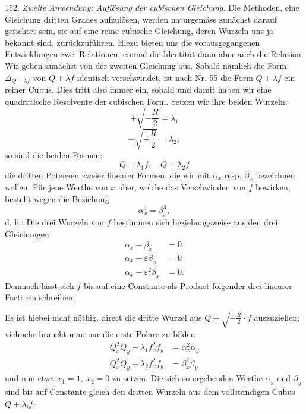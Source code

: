 152. \textit{Zweite Anwendung: Auflösung der cubischen Gleichung.} Die Methoden, eine Gleichung dritten Grades aufzulösen, werden naturgemäss zunächst darauf gerichtet sein, sie auf eine reine cubische Gleichung, deren Wurzeln uns ja bekannt sind, zurückzuführen. Hiezu bieten uns die vorausgegangenen Entwicklungen zwei Relationen, einmal die  Identität
dann aber auch die Relation
Wir gehen zunächst von der zweiten Gleichung aus. Sobald nämlich die  Form $\Delta_{Q+\lambda f}$ von $Q+\lambda f$ identisch verschwindet, ist nach Nr. 55 die Form $Q+\lambda f$ ein reiner Cubus. Dies tritt also immer ein, sobald
und damit haben wir eine quadratische Resolvente der cubischen Form. Setzen wir ihre beiden Wurzeln:
\[
+\sqrt{-\frac{R}{2}} = \lambda_1
\]
\[
-\sqrt{-\frac{R}{2}} = \lambda_2,
\]
so sind die beiden Formen:
\[
Q+\lambda_1 f, \quad Q+\lambda_2 f
\]
die dritten Potenzen zweier linearer Formen, die wir mit $\alpha_x$ resp. $\beta_x$ bezeichnen wollen. Für jene Werthe von $x$ aber, welche das Verschwinden von $f$ bewirken, besteht wegen
die Beziehung
\[
\alpha_x^3 = \beta_x^3,
\]
d. h.: \glqq Die drei Wurzeln von $f$ bestimmen sich beziehungsweise aus den drei Gleichungen
\[
\begin{aligned}
\alpha_x - \beta_x &= 0\\
\alpha_x - \varepsilon\beta_x &= 0\\
\alpha_x - \varepsilon^2\beta_x &= 0.
\end{aligned}
\]\grqq{}
Demnach lässt sich $f$ bis auf eine Constante als Product folgender drei linearer Factoren schreiben:


Es ist hiebei nicht nöthig, direct die dritte Wurzel aus $Q\pm\sqrt{-\frac{R}{2}}\cdot f$ auszuziehen; vielmehr braucht man nur die erste Polare zu bilden
\[
\begin{aligned}
Q_x^2 Q_y + \lambda_1 f_x^2 f_y &= \alpha_x^2\alpha_y\\
Q_x^2 Q_y + \lambda_2 f_x^2 f_y &= \beta_x^2\beta_y
\end{aligned}
\]
und nun etwa $x_1 = 1,\ x_2 = 0$ zu setzen. Die sich so ergebenden Werthe $\alpha_y$ und $\beta_y$ sind bis auf Constante gleich den dritten Wurzeln aus dem vollständigen Cubus $Q+\lambda_i f$.

